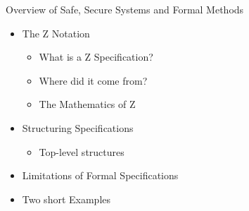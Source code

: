 \documentclass{beamerswitch}
\begin{document}
\begin{frame}{Overview of Safe, Secure Systems and Formal Methods}
 \begin{itemize}
  	\item The Z Notation
         	\begin{itemize}
         		\item What is a Z Specification?
        	         	\item Where did it come from? 
        		         \item The Mathematics of Z
         	\end{itemize}
	\item Structuring Specifications
		\begin{itemize}
			\item Top-level structures
		\end{itemize}
	\item Limitations of Formal Specifications
	\item Two short Examples	

\end{itemize}	

\end{frame}
\end{document}

